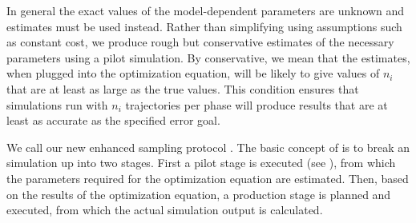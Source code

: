 In general the exact values of the model-dependent parameters are unknown and estimates must be used instead. Rather than simplifying using assumptions such as constant cost\supercite{Allen:2006ch,Borrero:2008il}, we produce rough but conservative estimates of the necessary parameters using a pilot simulation. By conservative, we mean that the estimates, when plugged into the optimization equation, will be likely to give values of $n_i$ that are at least as large as the true values. This condition ensures that simulations run with $n_i$ trajectories per phase will produce results that are at least as accurate as the specified error goal.

We call our new enhanced sampling protocol . The basic concept of  is to break an  simulation up into two stages. First a pilot stage is executed (see ), from which the parameters required for the optimization equation are estimated. Then, based on the results of the optimization equation, a production stage is planned and executed, from which the actual simulation output is calculated.

